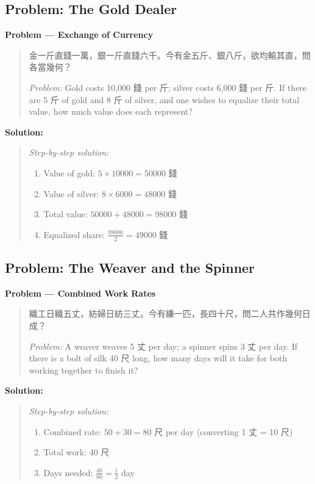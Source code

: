 \documentclass[11pt,a4paper]{article}
\newcommand{\zh}[1]{{#1}}
\newenvironment{chproblem}[1][]{%
  \par\medskip\noindent\textbf{\textcolor{sectioncolor}{#1}}\par\nopagebreak
  \begin{quote}\small
}{%
  \end{quote}\medskip
}
\newenvironment{chsolution}{%
  \par\medskip\noindent\textbf{\textcolor{notecolor}{Solution:}}\par\nopagebreak
  \begin{quote}\small
}{%
  \end{quote}\medskip
}
\newenvironment{stepbystep}{%
  \par\smallskip\noindent\textit{Step-by-step solution:}\par\nopagebreak
  \begin{enumerate}[leftmargin=2em,label=\textbf{Step \arabic*:},ref=\arabic*]
}{%
  \end{enumerate}\medskip
}
\begin{document}
\subsection{Problem: The Gold Dealer}

\begin{chproblem}[Problem --- Exchange of Currency]
\zh{金一斤直錢一萬，銀一斤直錢六千。今有金五斤、銀八斤，欲均輸其直，問各當幾何？}

\medskip
\textit{Problem:} Gold costs 10,000 \zh{錢} per \zh{斤}; silver costs 6,000
\zh{錢} per \zh{斤}. If there are 5 \zh{斤} of gold and 8 \zh{斤} of
silver, and one wishes to equalize their total value, how much value does each
represent?
\end{chproblem}

\begin{chsolution}
\begin{stepbystep}
\item Value of gold: $5 \times 10000 = 50000$ \zh{錢}
\item Value of silver: $8 \times 6000 = 48000$ \zh{錢}
\item Total value: $50000 + 48000 = 98000$ \zh{錢}
\item Equalized share: $\frac{98000}{2} = 49000$ \zh{錢}
\end{stepbystep}
\end{chsolution}

\subsection{Problem: The Weaver and the Spinner}

\begin{chproblem}[Problem --- Combined Work Rates]
\zh{織工日織五丈，紡婦日紡三丈。今有縑一匹，長四十尺，問二人共作幾何日成？}

\medskip
\textit{Problem:} A weaver weaves 5 \zh{丈} per day; a spinner spins 3 \zh{丈}
per day. If there is a bolt of silk 40 \zh{尺} long, how many days will it
take for both working together to finish it?
\end{chproblem}

\begin{chsolution}
\begin{stepbystep}
\item Combined rate: $50 + 30 = 80$ \zh{尺} per day (converting 1 \zh{丈} = 10 \zh{尺})
\item Total work: 40 \zh{尺}
\item Days needed: $\frac{40}{80} = \frac{1}{2}$ day
\end{stepbystep}
\end{chsolution}
\end{document}
